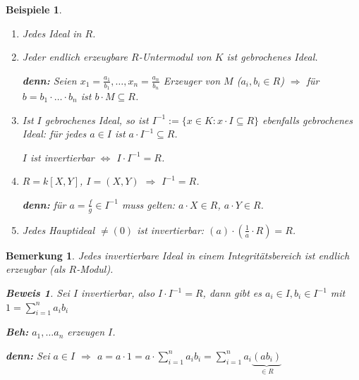 \documentclass[a4paper,12pt]{scrbook}
\theoremstyle{break}
\newtheorem{Bem}[Def]{Bemerkung}
\theoremstyle{nonumberbreak}
\newtheorem{Bew}{Beweis}
\newtheorem{nnBsp}{Beispiele}
\theoremstyle{nonumberplain}
\begin{document}
\begin{nnBsp}
\begin{enumerate}
\item[0)] Jedes Ideal in $R$.

\item[1)] Jeder endlich erzeugbare $R$-Untermodul von $K$ ist gebrochenes Ideal.

\textbf{denn:} Seien $x_1 = \frac{a_1}{b_1}, \ldots, x_n = \frac{a_n}{b_n}$ Erzeuger von $M$ ($a_i, b_i \in R$) $\Rightarrow$ für $b = b_1 \cdot \ldots \cdot b_n$ ist $b \cdot M \subseteq R$.

\item[2)] Ist $I$ gebrochenes Ideal, so ist $I^{-1} := \{ x \in K : x \cdot I \subseteq R \}$ ebenfalls gebrochenes Ideal: für jedes $a \in I$ ist $a \cdot I^{-1} \subseteq R$.

$I$ ist invertierbar $\Leftrightarrow$ $I \cdot I^{-1} = R$.

\item[3)] $R = k[X,Y]$, $I = (X,Y)$ $\Rightarrow$ $I^{-1} = R$.

\textbf{denn:} für $a = \frac{f}{g} \in I^{-1}$ muss gelten: $a \cdot X \in R$, $a \cdot Y \in R$.

\item[4)] Jedes Hauptideal $\neq (0)$ ist invertierbar: $(a) \cdot (\frac{1}{a} \cdot R) = R$.
\end{enumerate}
\end{nnBsp}

\begin{Bem}\label{2.41}
Jedes invertierbare Ideal in einem Integritätsbereich ist endlich erzeugbar (als $R$-Modul).

\begin{Bew}
Sei $I$ invertierbar, also $I \cdot I^{-1} = R$, dann gibt es $a_i \in I, b_i \in I^{-1}$ mit $1 = \sum_{i=1}^{n} a_i b_i$

\textbf{Beh:} $a_1, \ldots a_n$ erzeugen $I$.

\textbf{denn:} Sei $a \in I$ $\Rightarrow$ $a = a \cdot 1 = a \cdot \sum_{i=1}^{n} a_i b_i = \sum_{i=1}^{n} a_i \underbrace{(a b_i)}_{\in R}$

\end{Bew}
\end{Bem}
\end{document}
